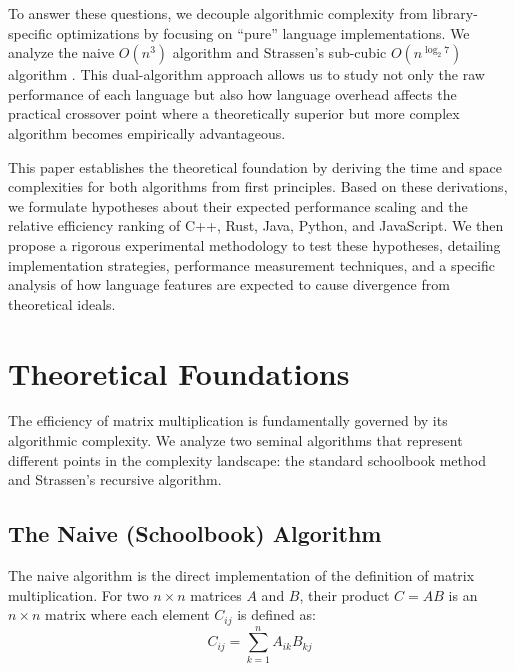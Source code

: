 \documentclass[11pt, a4paper, titlepage]{scrartcl}
\begin{document}
To answer these questions, we decouple algorithmic complexity from library-specific optimizations by focusing on ``pure'' language implementations. We analyze the naive \(O(n^3)\) algorithm and Strassen's sub-cubic \(O(n^{\log_2 7})\) algorithm \autocite{Khan2015}. This dual-algorithm approach allows us to study not only the raw performance of each language but also how language overhead affects the practical crossover point where a theoretically superior but more complex algorithm becomes empirically advantageous.

This paper establishes the theoretical foundation by deriving the time and space complexities for both algorithms from first principles. Based on these derivations, we formulate hypotheses about their expected performance scaling and the relative efficiency ranking of C++, Rust, Java, Python, and JavaScript. We then propose a rigorous experimental methodology to test these hypotheses, detailing implementation strategies, performance measurement techniques, and a specific analysis of how language features are expected to cause divergence from theoretical ideals.
\newpage

\section{Theoretical Foundations}

The efficiency of matrix multiplication is fundamentally governed by its algorithmic complexity. We analyze two seminal algorithms that represent different points in the complexity landscape: the standard schoolbook method and Strassen's recursive algorithm.

\subsection{The Naive (Schoolbook) Algorithm}

The naive algorithm is the direct implementation of the definition of matrix multiplication. For two \(n \times n\) matrices \(A\) and \(B\), their product \(C = AB\) is an \(n \times n\) matrix where each element \(C_{ij}\) is defined as:
\[
C_{ij} = \sum_{k=1}^{n} A_{ik} B_{kj}
\]
\end{document}

